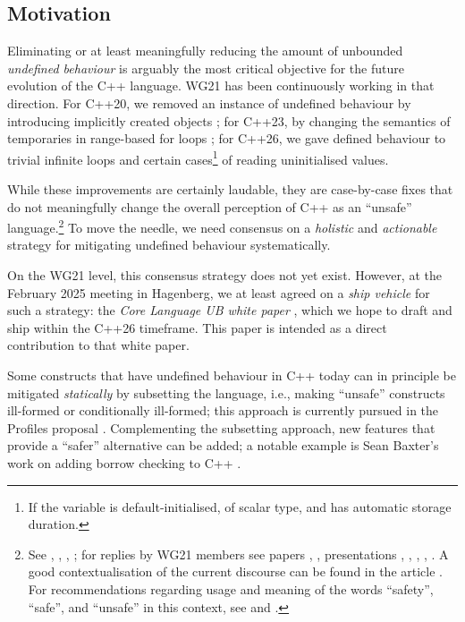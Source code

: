 \subsection{Motivation}
\label{motivation}

Eliminating or at least meaningfully reducing the amount of unbounded \emph{undefined behaviour} is arguably the most critical objective for the future evolution of the C++ language. WG21 has been continuously working in that direction. For C++20, we removed an instance of undefined behaviour by introducing implicitly created objects \cite{P0593R6}; for C++23, by changing the semantics of temporaries in range-based for loops \cite{P2012R2}; for C++26, we gave defined behaviour to trivial infinite loops \cite{P2809R3} and certain cases\footnote{If the variable is default-initialised, of scalar type, and has automatic storage duration.} of reading uninitialised values.

While these improvements are certainly laudable, they are case-by-case fixes that do not meaningfully change the overall perception of C++ as an ``unsafe'' language.\footnote{See \cite{NSA2022}, \cite{CR2023}, \cite{CISA2023}, \cite{ONCD2024}; for replies by WG21 members see papers \cite{P2739R0}, \cite{P2759R1}, presentations \cite{Abrahams2023}, \cite{Bastien2023}, \cite{Carruth2023}, \cite{Doumler2023}, \cite{Parent2023}. A good contextualisation of the current discourse can be found in the article \cite{Sutter2024}. For recommendations regarding usage and meaning of the words ``safety'', ``safe'', and ``unsafe'' in this context, see \cite{P3500R1} and \cite{P3578R0}.} To move the needle, we need consensus on a \emph{holistic} and \emph{actionable} strategy for mitigating undefined behaviour systematically.

On the WG21 level, this consensus strategy does not yet exist. However, at the February 2025 meeting in Hagenberg, we at least agreed on a \emph{ship vehicle} for such a strategy: the \emph{Core Language UB white paper} \cite{P3656R0}, which we hope to draft and ship within the C++26 timeframe. This paper is intended as a direct contribution to that white paper.

Some constructs that have undefined behaviour in C++ today can in principle be mitigated \emph{statically} by subsetting the language, i.e., making ``unsafe'' constructs ill-formed or conditionally ill-formed; this approach is currently pursued in the Profiles proposal \cite{P3081R2}. Complementing the subsetting approach, new features that provide a ``safer'' alternative can be added; a notable example is Sean Baxter's work on adding borrow checking to C++ \cite{P3390R0}.

